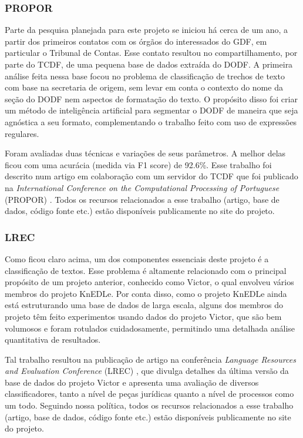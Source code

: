 \documentclass[12pt]{article}
\begin{document}
\subsubsection{PROPOR}
Parte da pesquisa planejada para este projeto se iniciou há cerca de um ano, a partir dos primeiros contatos com os órgãos do interessados do GDF, em particular o Tribunal de Contas. Esse contato resultou no compartilhamento, por parte do TCDF, de uma pequena base de dados extraída do DODF. A primeira análise feita nessa base focou no problema de classificação de trechos de texto com base na secretaria de origem, sem levar em conta o contexto do nome da seção do DODF nem aspectos de formatação do texto. O propósito disso foi criar um método de inteligência artificial para segmentar o DODF de maneira que seja agnóstica a seu formato, complementando o trabalho feito com uso de expressões regulares.

Foram avaliadas duas técnicas e variações de seus parâmetros. A melhor delas ficou com uma acurácia (medida via F1 score) de 92.6\%.
Esse trabalho foi descrito num artigo em colaboração com um servidor do TCDF que foi publicado na {\em International Conference on the Computational Processing of Portuguese} (PROPOR) \cite{luz_etal_propor2020}. Todos os recursos relacionados a esse trabalho (artigo, base de dados, código fonte etc.)  estão disponíveis publicamente no site do projeto.

\subsubsection{LREC}

Como ficou claro acima, um dos componentes essenciais deste projeto é a classificação de textos. Esse problema é altamente relacionado com o principal propósito de um projeto anterior, conhecido como Victor, o qual envolveu vários membros do projeto KnEDLe. Por conta disso, como o projeto KnEDLe ainda está estruturando uma base de dados de larga escala, alguns dos membros do projeto têm feito experimentos usando dados do projeto Victor, que são bem volumosos e foram rotulados cuidadosamente, permitindo uma detalhada análise quantitativa de resultados. 

Tal trabalho resultou na publicação de artigo na conferência \emph{Language Resources and Evaluation Conference} (LREC) \cite{luz_etal_lrec2020}, que divulga detalhes da última versão da base de dados do projeto Victor e apresenta uma avaliação de diversos classificadores, tanto a nível de peças jurídicas quanto a nível de processos como um todo. Seguindo nossa política, todos os recursos relacionados a esse trabalho (artigo, base de dados, código fonte etc.) estão disponíveis publicamente no site do projeto.
\end{document}
